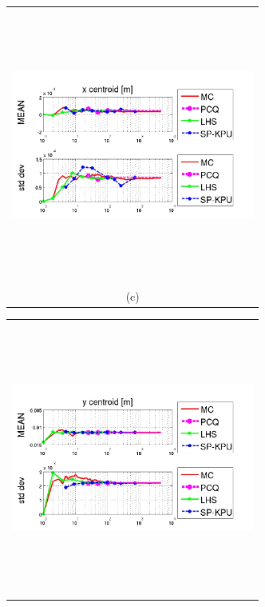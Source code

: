 \documentclass{article}
\newcommand{\Pic}[2][0.85]{\begin{center}\texttt{[image: \#2]}
 \end{center} }
\begin{document}
\begin{figure}[H]
\begin{minipage}[b]{0.6\textwidth}
\begin{tabular}{c}
        \end{tabular}
    \end{minipage}
    \begin{minipage}{0.6\textwidth}
        \begin{tabular}{c}
	\includegraphics[width=8cm,height=9cm,keepaspectratio]{fig/picskpu/trei_KPU.jpg}\\
        (c)
        \end{tabular}
    \end{minipage}
   \begin{minipage}[c]{0.6\textwidth}
       \begin{tabular}{c}
       \includegraphics[width=8cm,height=9cm,keepaspectratio]{fig/picskpu/patru_KPU.jpg}\\

\end{tabular}
\end{minipage}
\end{figure}
\end{document}
